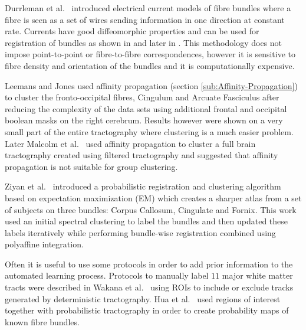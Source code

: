\documentclass{bioinfo}
\begin{document}
Durrleman et al.~\cite{Durrleman2009} introduced electrical current
models of fibre bundles where a fibre is seen as a set of wires sending
information in one direction at constant rate. Currents have good
diffeomorphic properties and can be used for registration of bundles
as shown in \cite{Durrleman2009} and later in \cite{durrleman2010registration}.
This methodology does not impose point-to-point or fibre-to-fibre
correspondences, however it is sensitive to fibre density and orientation
of the bundles and it is computationally expensive.

Leemans and Jones \cite{leemans17new} used affinity propagation (section
\ref{sub:Affinity-Propagation}) to cluster the fronto-occipital fibres,
Cingulum and Arcuate Fasciculus after reducing the complexity of the
data sets using additional frontal and occipital boolean masks on
the right cerebrum. Results however were shown on a very small part
of the entire tractography where clustering is a much easier problem.
Later Malcolm et al.~\cite{malcolm2009filtered} used affinity propagation
to cluster a full brain tractography created using filtered tractography
and suggested that affinity propagation is not suitable for group
clustering. 

Ziyan et al.~\cite{ziyan2009consistency} introduced a probabilistic
registration and clustering algorithm based on expectation maximization
(EM) which creates a sharper atlas from a set of subjects on three
bundles: Corpus Callosum, Cingulate and Fornix. This work used an
initial spectral clustering \cite{ODonnell_IEEETMI07} to label the
bundles and then updated these labels iteratively while performing
bundle-wise registration combined using polyaffine integration. 

Often it is useful to use some protocols in order to add prior information
to the automated learning process. Protocols to manually label $11$
major white matter tracts were described in Wakana et al.~\cite{Wakana2007NeuroImage}
using ROIs to include or exclude tracks generated by deterministic
tractography. Hua et al.~\cite{Hua2008NeuroImage} used regions of
interest together with probabilistic tractography in order to create
probability maps of known fibre bundles. 
\end{document}
